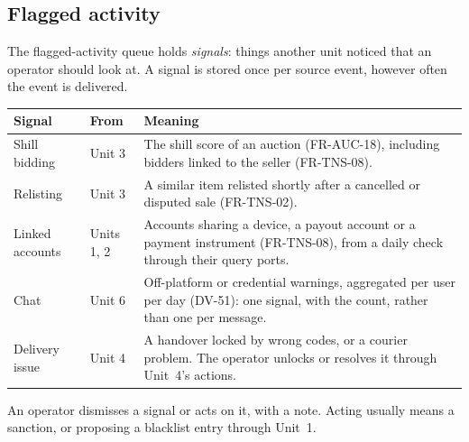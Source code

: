 \documentclass[11pt,a4paper]{article}
\newenvironment{dtable}[1]{\small\begin{longtable}{#1}}{\end{longtable}}
\begin{document}
\subsection{Flagged activity}
\label{sec:signals}
The flagged-activity queue holds \emph{signals}: things another unit noticed that an operator should look at. A signal is stored once per source event, however often the event is delivered.
\begin{dtable}{@{}>{\raggedright\arraybackslash}p{4.0cm}>{\raggedright\arraybackslash}p{2.0cm}>{\raggedright\arraybackslash}p{9.2cm}@{}}
\toprule
\textbf{Signal} & \textbf{From} & \textbf{Meaning} \\ \midrule \endhead
Shill bidding & Unit 3 & The shill score of an auction (FR-AUC-18), including bidders linked to the seller (FR-TNS-08). \\
Relisting & Unit 3 & A similar item relisted shortly after a cancelled or disputed sale (FR-TNS-02). \\
Linked accounts & Units 1, 2 & Accounts sharing a device, a payout account or a payment instrument (FR-TNS-08), from a daily check through their query ports. \\
Chat & Unit 6 & Off-platform or credential warnings, aggregated per user per day (DV-51): one signal, with the count, rather than one per message. \\
Delivery issue & Unit 4 & A handover locked by wrong codes, or a courier problem. The operator unlocks or resolves it through Unit~4's actions. \\
\bottomrule
\end{dtable}
An operator dismisses a signal or acts on it, with a note. Acting usually means a sanction, or proposing a blacklist entry through Unit~1.
\end{document}
